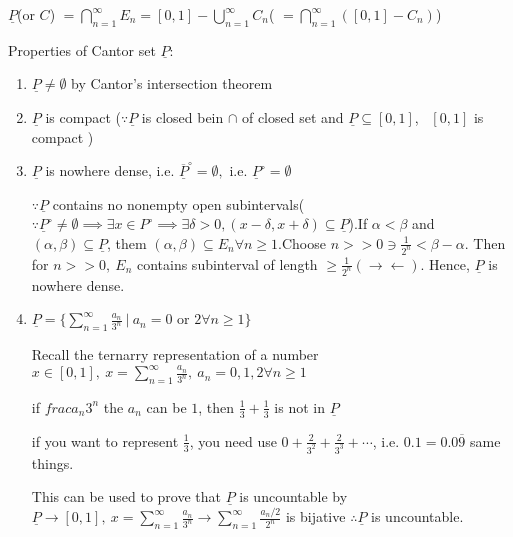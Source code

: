 \begin{defn}
	$\underline{P}$(or $C$) $ = \bigcap^{\infty}_{n = 1}E_n = [0,1] - \bigcup^{\infty}_{n = 1}C_n$( $= \bigcap^{\infty}_{n=1}([0,1] - C_n)$)
\end{defn}

Properties of Cantor set $\underline{P}:$

\begin{enumerate}[wide]
	\item $\underline{P} \neq \emptyset$ by Cantor's intersection theorem
	\item $\underline{P}$ is compact ($\because \underline{P}$ is closed bein $\cap$ of closed set and $\underline{P} \subseteq [0,1]$,~ $[0,1]$ is compact )
	\item $\underline{P}$ is nowhere dense, i.e. $\overline{\underline{P}}^{\circ} = \emptyset,$ i.e. $\underline{P}^{\circ} = \emptyset$
	
	$\because \underline{P}$ contains no nonempty open subintervals($\because \underline{P}^{\circ} \neq \emptyset \implies \exists x \in P^{\circ} \implies \exists \delta > 0 ,(x-\delta,x+\delta) \subseteq \underline{P}$).If $\alpha < \beta$ and $(\alpha,\beta) \subseteq \underline{P}$, them $(\alpha , \beta) \subseteq E_n \forall n \geq 1$.Choose $n >> 0 \ni \frac{1}{2^n} < \beta - \alpha$. Then for $n >> 0,~E_n$ contains subinterval of length $\geq \frac{1}{2^n} (\rightarrow\leftarrow)$. Hence, $\underline{P}$ is nowhere dense.
	
	\item $\underline{P} = \{\sum^{\infty}_{n=1}\frac{a_n}{3^n} ~|~ a_n = 0 \text{ or } 2 \forall n \geq 1\}$
	
	Recall the ternarry representation of a number $x \in [0,1],~ x = \sum^{\infty}_{n = 1} \frac{a_n}{3^n},~a_n = 0,1,2 \forall n \geq 1$
	
	\begin{tcolorbox}
		if $frac{a_n}{3^n}$ the $a_n$ can be $1$, then $\frac{1}{3} + \frac{1}{3} $ is not in $\underline{P}$
		
		if you want to represent $\frac{1}{3}$, you need use $0 + \frac{2}{3^2} + \frac{2}{3^3} + \cdots$, i.e. $0.1 = 0.0\overline{9}$ same things.
	\end{tcolorbox}
	
	This can be used to prove that $\underline{P}$ is uncountable by $\underline{P} \rightarrow [0,1],~x = \sum^{\infty}_{n=1}\frac{a_n}{3^n} \rightarrow \sum^{\infty}_{n=1}\frac{a_n / 2}{2^n}$ is bijative $\therefore \underline{P}$ is uncountable.
	

\end{enumerate}
